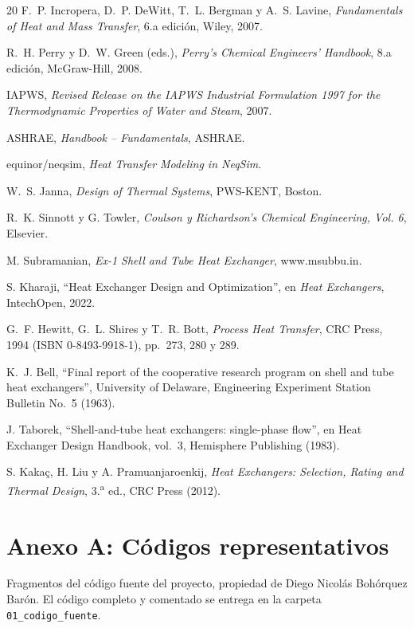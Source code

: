 \documentclass[11pt,a4paper]{article}
\begin{document}
{\begin{thebibliography}{20}
 F.~P. Incropera, D.~P. DeWitt, T.~L. Bergman y A.~S.
Lavine, \emph{Fundamentals of Heat and Mass Transfer}, 6.a edici\'on,
Wiley, 2007.

 R.~H. Perry y D.~W. Green (eds.), \emph{Perry's Chemical
Engineers' Handbook}, 8.a edici\'on, McGraw-Hill, 2008.

 IAPWS, \emph{Revised Release on the IAPWS Industrial
Formulation 1997 for the Thermodynamic Properties of Water and Steam}, 2007.

 ASHRAE, \emph{Handbook -- Fundamentals}, ASHRAE.

 equinor/neqsim, \emph{Heat Transfer Modeling in NeqSim}.

 W.~S. Janna, \emph{Design of Thermal Systems}, PWS-KENT, Boston.

 R.~K. Sinnott y G. Towler, \emph{Coulson y
Richardson's Chemical Engineering, Vol. 6}, Elsevier.

 M. Subramanian, \emph{Ex-1 Shell and Tube Heat Exchanger}, www.msubbu.in.

 S. Kharaji, ``Heat Exchanger Design and Optimization'',
en \emph{Heat Exchangers}, IntechOpen, 2022.

 G.~F. Hewitt, G.~L. Shires y T.~R. Bott, \emph{Process
Heat Transfer}, CRC Press, 1994 (ISBN 0-8493-9918-1), pp.~273, 280 y 289.

 K.~J. Bell, ``Final report of the cooperative research 
program on shell and tube heat exchangers'', University of Delaware, 
Engineering Experiment Station Bulletin No.~5 (1963).

 J. Taborek, ``Shell-and-tube heat exchangers: 
single-phase flow'', en Heat Exchanger Design Handbook, vol.~3, 
Hemisphere Publishing (1983).

 S. Kaka\c{c}, H. Liu y A. Pramuanjaroenkij, 
\emph{Heat Exchangers: Selection, Rating and Thermal Design}, 3.\textsuperscript{a} ed., CRC Press (2012).

\end{thebibliography}}


\section*{Anexo A: C\'odigos representativos}

{\small\color{gristexto} Fragmentos del c\'odigo fuente del proyecto,
propiedad de Diego Nicol\'as Boh\'orquez Bar\'on. El c\'odigo completo y
comentado se entrega en la carpeta \texttt{01\_codigo\_fuente}.}
\end{document}

